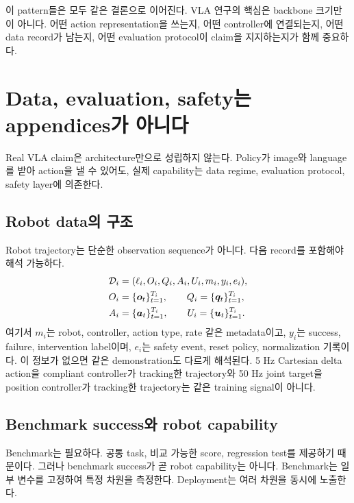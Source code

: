 이 pattern들은 모두 같은 결론으로 이어진다. VLA 연구의 핵심은 backbone 크기만이 아니다. 어떤 action representation을 쓰는지, 어떤 controller에 연결되는지, 어떤 data record가 남는지, 어떤 evaluation protocol이 claim을 지지하는지가 함께 중요하다.

\section{Data, evaluation, safety는 appendices가 아니다}

Real VLA claim은 architecture만으로 성립하지 않는다. Policy가 image와 language를 받아 action을 낼 수 있어도, 실제 capability는 data regime, evaluation protocol, safety layer에 의존한다.

\subsection{Robot data의 구조}
Robot trajectory는 단순한 observation sequence가 아니다. 다음 record를 포함해야 해석 가능하다.
\begin{equation}
\begin{aligned}
\mathcal{D}_i
&=
(\ell_i,O_i,Q_i,A_i,U_i,m_i,y_i,e_i),\\
O_i &= \{\bm{o}_t\}_{t=1}^{T_i},
\qquad
Q_i = \{\bm{q}_t\}_{t=1}^{T_i},\\
A_i &= \{\bm{a}_t\}_{t=1}^{T_i},
\qquad
U_i = \{\bm{u}_t\}_{t=1}^{T_i}.
\end{aligned}
\label{eq:data-record}
\end{equation}
여기서 $m_i$는 robot, controller, action type, rate 같은 metadata이고, $y_i$는 success, failure, intervention label이며, $e_i$는 safety event, reset policy, normalization 기록이다. 이 정보가 없으면 같은 demonstration도 다르게 해석된다. 5 Hz Cartesian delta action을 compliant controller가 tracking한 trajectory와 50 Hz joint target을 position controller가 tracking한 trajectory는 같은 training signal이 아니다.

\subsection{Benchmark success와 robot capability}
Benchmark는 필요하다. 공통 task, 비교 가능한 score, regression test를 제공하기 때문이다. 그러나 benchmark success가 곧 robot capability는 아니다. Benchmark는 일부 변수를 고정하여 특정 차원을 측정한다. Deployment는 여러 차원을 동시에 노출한다.

